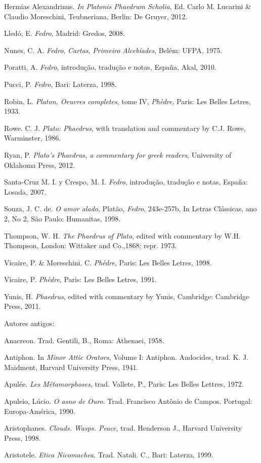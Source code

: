 Hermias Alexandrinus. \emph{In Platonis Phaedrum Scholia}, Ed. Carlo M.
Lucarini \& Claudio Moreschini, Teubneriana, Berlin: De Gruyer, 2012.

Lledó, E. \emph{Fedro}, Madrid: Gredos, 2008.

Nunes, C. A. \emph{Fedro}, \emph{Cartas}, \emph{Primeiro Alcebíades},
Belém: UFPA, 1975.

Poratti, A. \emph{Fedro}, introdução, tradução e notas, España, Akal,
2010.

Pucci, P. \emph{Fedro}, Bari: Laterza, 1998.

Robin, L. \emph{Platon, Oeuvres completes}, tome IV, \emph{Phèdre},
Paris: Les Belles Letres, 1933.

Rowe. C. J. \emph{Plato: Phaedrus}, with translation and commentary by
C.J. Rowe, Warminster, 1986.

Ryan, P. \emph{Plato's Phaedrus, a commentary for greek readers},
University of Oklahoma Press, 2012.

Santa-Cruz M. I. y Crespo, M. I. \emph{Fedro}, introdução, tradução e
notas, España: Losada, 2007.

Souza, J. C. de. \emph{O amor alado}, Platão, \emph{Fedro}, 243e-257b,
In Letras Clássicas, ano 2, No 2, São Paulo: Humanitas, 1998.

Thompson, W. H. \emph{The Phaedrus of Plato}, edited with commentary by
W.H. Thompson, London: Wittaker and Co.,1868; repr. 1973.

Vicaire, P. \& Moreschini. C. \emph{Phèdre}, Paris: Les Belles Letres,
1998.

Vicaire, P. \emph{Phèdre}, Paris: Les Belles Letres, 1991.

Yunis, H. \emph{Phaedrus}, edited with commentary by Yunis, Cambridge:
Cambridge Press, 2011.

Autores antigos:

Anacreon. Trad. Gentili, B., Roma: Athenaei, 1958.

Antiphon. In \emph{Minor Attic Orators}, Volume I: Antiphon. Andocides,
trad. K. J. Maidment, Harvard University Press, 1941.

Apulée. \emph{Les Métamorphoses}, trad. Vallete, P., Paris: Les Belles
Lettres, 1972.

Apuleio, Lúcio. \emph{O asno de Ouro}. Trad. Francisco Antônio de
Campos. Portugal: Europa-América, 1990.

Aristophanes. \emph{Clouds. Wasps. Peace}, trad. Henderson J., Harvard
University Press, 1998.

Aristotele. \emph{Etica Nicomachea}. Trad. Natali. C., Bari: Laterza,
1999.

